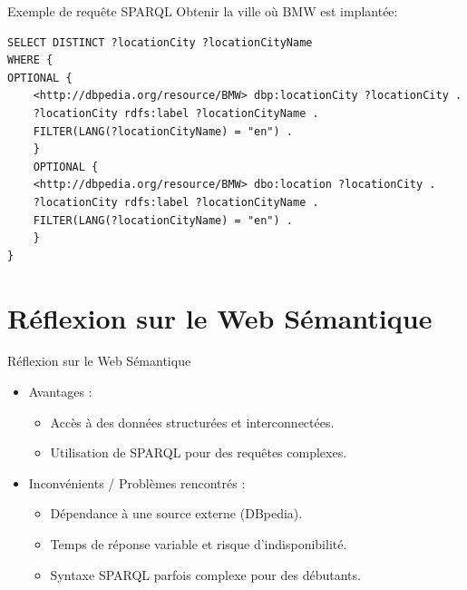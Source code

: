 \documentclass[10pt]{beamer}
\begin{document}
\begin{frame}[fragile]{Exemple de requête SPARQL}
Obtenir la ville où BMW est implantée:
{\footnotesize
\begin{verbatim}
SELECT DISTINCT ?locationCity ?locationCityName
WHERE {
OPTIONAL {
    <http://dbpedia.org/resource/BMW> dbp:locationCity ?locationCity .
    ?locationCity rdfs:label ?locationCityName .
    FILTER(LANG(?locationCityName) = "en") .
    }
    OPTIONAL {
    <http://dbpedia.org/resource/BMW> dbo:location ?locationCity .
    ?locationCity rdfs:label ?locationCityName .
    FILTER(LANG(?locationCityName) = "en") .
    }
}
\end{verbatim}
}
\end{frame}
\section{Réflexion sur le Web Sémantique}
\begin{frame}{Réflexion sur le Web Sémantique}
\begin{itemize}
    \item Avantages :  
        \begin{itemize}
            \item Accès à des données structurées et interconnectées.  
            \item Utilisation de SPARQL pour des requêtes complexes.  
        \end{itemize}
    \item Inconvénients / Problèmes rencontrés :  
        \begin{itemize}
            \item Dépendance à une source externe (DBpedia).  
            \item Temps de réponse variable et risque d'indisponibilité.  
            \item Syntaxe SPARQL parfois complexe pour des débutants.  
        \end{itemize}
\end{itemize}
\end{frame}

\end{document}
